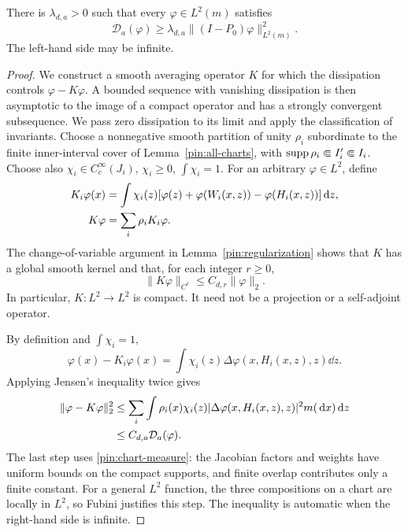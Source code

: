 \begin{theorem}
\label{pin:gap-theorem}
There is $\lambda_{d,a}>0$ such that every $\varphi\in L^2(m)$ satisfies
\begin{equation}
             \mathcal D_a(\varphi)
               \ge\lambda_{d,a}\|(I-P_0)\varphi\|_{L^2(m)}^2.
 \label{pin:gap-inequality}
\end{equation}
The left-hand side may be infinite.
\end{theorem}

\begin{proof}
We construct a smooth averaging operator $K$ for which the dissipation
controls $\varphi-K\varphi$. A bounded sequence with vanishing
dissipation is then asymptotic to the image of a compact operator and
has a strongly convergent subsequence. We pass zero dissipation to its
limit and apply the classification of invariants.
Choose a nonnegative smooth partition of unity $\rho_i$ subordinate
to the finite inner-interval cover of Lemma~\ref{pin:all-charts}, with
$\operatorname{supp}\rho_i\Subset I'_i\Subset I_i$. Choose also
$\chi_i\in C_c^\infty(J_i)$, $\chi_i\ge0$, $\int\chi_i=1$.
For an arbitrary $\varphi\in L^2$, define
\begin{align}
 K_i\varphi(x)&=\int\chi_i(z)
  [\varphi(z)+\varphi(W_i(x,z))-\varphi(H_i(x,z))]\,\mathrm d z,\notag\\
 K\varphi&=\sum_i\rho_iK_i\varphi.
 \label{pin:compact-average}
\end{align}
The change-of-variable argument in Lemma~\ref{pin:regularization}
shows that $K$ has a global smooth kernel and that, for each integer
$r\ge0$,
\begin{equation}
                     \|K\varphi\|_{C^r}\le C_{d,r}\|\varphi\|_2.
 \label{pin:compact-smoothing}
\end{equation}
In particular, $K:L^2\to L^2$ is compact. It need not be a projection
or a self-adjoint operator.

By definition and $\int\chi_i=1$,
\[
 \varphi(x)-K_i\varphi(x)
  =\int\chi_i(z)\Delta\varphi(x,H_i(x,z),z)\dd z.
\]
Applying Jensen's inequality twice gives
\begin{align}
 \|\varphi-K\varphi\|_2^2
 &\le\sum_i\int\rho_i(x)\chi_i(z)
       |\Delta\varphi(x,H_i(x,z),z)|^2m(\,\mathrm d x)\,\mathrm d z\notag\\
 &\le C_{d,a}\mathcal D_a(\varphi).
 \label{pin:defect-bound}
\end{align}
The last step uses \eqref{pin:chart-measure}: the Jacobian factors and
weights have uniform bounds on the compact supports, and finite
overlap contributes only a finite constant. For a general $L^2$
function, the three compositions on a chart are locally in $L^2$, so
Fubini justifies this step. The inequality is automatic when the
right-hand side is infinite.


\end{proof}
